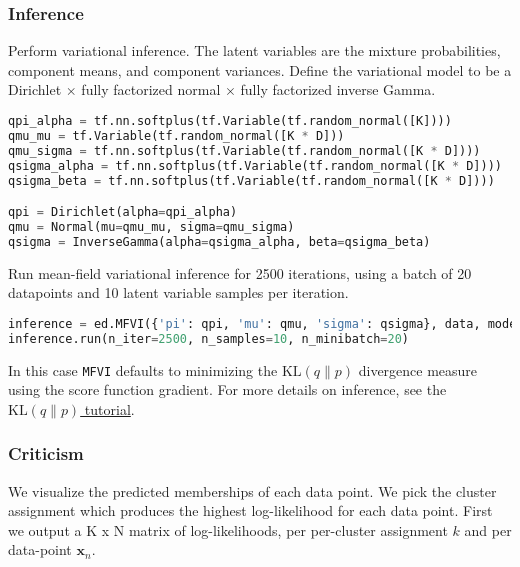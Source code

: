 \subsubsection{Inference}
Perform variational inference.
%
The latent variables are the mixture probabilities,
component means, and component variances.
Define the variational model to be a Dirichlet $\times$ fully factorized normal
$\times$ fully factorized inverse Gamma.
%
\begin{lstlisting}[language=Python]
qpi_alpha = tf.nn.softplus(tf.Variable(tf.random_normal([K])))
qmu_mu = tf.Variable(tf.random_normal([K * D]))
qmu_sigma = tf.nn.softplus(tf.Variable(tf.random_normal([K * D])))
qsigma_alpha = tf.nn.softplus(tf.Variable(tf.random_normal([K * D])))
qsigma_beta = tf.nn.softplus(tf.Variable(tf.random_normal([K * D])))

qpi = Dirichlet(alpha=qpi_alpha)
qmu = Normal(mu=qmu_mu, sigma=qmu_sigma)
qsigma = InverseGamma(alpha=qsigma_alpha, beta=qsigma_beta)
\end{lstlisting}

Run mean-field variational inference for 2500 iterations, using a batch
of 20 datapoints and 10 latent variable samples per iteration.
\begin{lstlisting}[language=Python]
inference = ed.MFVI({'pi': qpi, 'mu': qmu, 'sigma': qsigma}, data, model)
inference.run(n_iter=2500, n_samples=10, n_minibatch=20)
\end{lstlisting}
In this case
\texttt{MFVI} defaults to minimizing the
$\text{KL}(q\|p)$ divergence measure using the score function
gradient.
For more details on inference, see the \href{/tutorials/klqp}{$\text{KL}(q\|p)$ tutorial}.


\subsubsection{Criticism}

We visualize the predicted memberships of each data point.
We pick the cluster assignment which produces
the highest log-likelihood for each data point.
First we output a K x N matrix of log-likelihoods, per
per-cluster assignment $k$ and per data-point $\mathbf{x}_n$.

